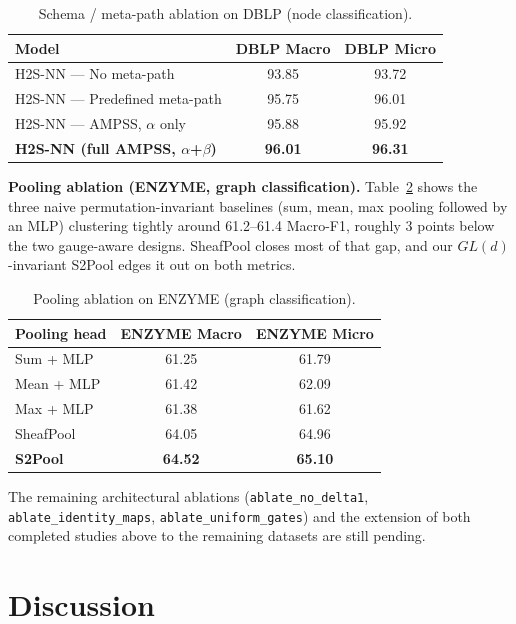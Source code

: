 \documentclass{article}
\begin{document}
\begin{table}[h]
  \centering
  \caption{Schema / meta-path ablation on DBLP (node classification).}
  \label{tab:ablation-schema}
  \small
  \begin{tabular}{lcc}
    \toprule
    \textbf{Model} & DBLP Macro & DBLP Micro \\
    \midrule
    H2S-NN --- No meta-path & 93.85 & 93.72 \\
    H2S-NN --- Predefined meta-path & 95.75 & 96.01 \\
    H2S-NN --- AMPSS, $\alpha$ only & 95.88 & 95.92 \\
    \textbf{H2S-NN (full AMPSS, $\alpha$+$\beta$)} & \textbf{96.01} & \textbf{96.31} \\
    \bottomrule
  \end{tabular}
\end{table}

\textbf{Pooling ablation (ENZYME, graph classification).} Table~\ref{tab:ablation-pooling} shows
the three naive permutation-invariant baselines (sum, mean, max pooling followed by an MLP)
clustering tightly around 61.2--61.4 Macro-F1, roughly 3 points below the two gauge-aware designs.
SheafPool closes most of that gap, and our $GL(d)$-invariant S2Pool edges it out on both metrics.

\begin{table}[h]
  \centering
  \caption{Pooling ablation on ENZYME (graph classification).}
  \label{tab:ablation-pooling}
  \small
  \begin{tabular}{lcc}
    \toprule
    \textbf{Pooling head} & ENZYME Macro & ENZYME Micro \\
    \midrule
    Sum + MLP & 61.25 & 61.79 \\
    Mean + MLP & 61.42 & 62.09 \\
    Max + MLP & 61.38 & 61.62 \\
    SheafPool & 64.05 & 64.96 \\
    \textbf{S2Pool} & \textbf{64.52} & \textbf{65.10} \\
    \bottomrule
  \end{tabular}
\end{table}

The remaining architectural ablations (\texttt{ablate\_no\_delta1}, \texttt{ablate\_identity\_maps},
\texttt{ablate\_uniform\_gates}) and the extension of both completed studies above to the remaining
datasets are still pending.

\section{Discussion}
\label{sec:discussion}
\end{document}
